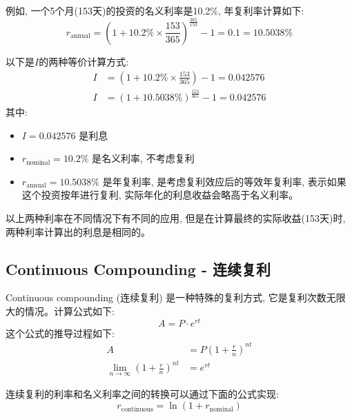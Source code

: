 例如, 一个5个月(153天)的投资的名义利率是10.2\%, 年复利率计算如下:
\begin{equation}
    r_{\text{annual}} = \left(1 + 10.2\% \times \frac{153}{365}\right)^{\frac{365}{153}} - 1 = 0.1 = 10.5038\%
\end{equation}

以下是$I$的两种等价计算方式:
\begin{subequations}
    \begin{align}
        I & = \left(1 + 10.2\% \times \frac{153}{365}\right) - 1 = 0.042576 \\
        I & = \left(1 + 10.5038\% \right)^{\frac{153}{365}} - 1 = 0.042576
    \end{align}
\end{subequations}
其中: 
\begin{itemize}
    \item $I = 0.042576$ 是利息
    \item $r_{\text{nominal}} = 10.2\%$ 是名义利率, 不考虑复利
    \item $r_{\text{annual}} = 10.5038\%$ 是年复利率, 是考虑复利效应后的等效年复利率, 表示如果这个投资按年进行复利, 实际年化的利息收益会略高于名义利率。
\end{itemize}
以上两种利率在不同情况下有不同的应用, 但是在计算最终的实际收益(153天)时, 两种利率计算出的利息是相同的。

\subsection{Continuous Compounding - 连续复利}
Continuous compounding (连续复利) 是一种特殊的复利方式, 它是复利次数无限大的情况。计算公式如下: 
\begin{equation}
    A = P \cdot e^{rt}
\end{equation}
这个公式的推导过程如下:
\begin{equation}
    \begin{aligned}
        A                                                     & = P \left(1 + \frac{r}{n}\right)^{nt} \\
        \lim_{n \to \infty} \left(1 + \frac{r}{n}\right)^{nt} & = e^{rt}
    \end{aligned}
\end{equation}

连续复利的利率和名义利率之间的转换可以通过下面的公式实现:
\begin{equation}
    r_{\text{continuous}} = \ln(1 + r_{\text{nominal}})
\end{equation}

